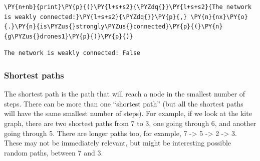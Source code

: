     \begin{tcolorbox}[breakable, size=fbox, boxrule=1pt, pad at break*=1mm,colback=cellbackground, colframe=cellborder]
\begin{Verbatim}[commandchars=\\\{\}]
\PY{n+nb}{print}\PY{p}{(}\PY{l+s+s2}{\PYZdq{}}\PY{l+s+s2}{The network is weakly connected:}\PY{l+s+s2}{\PYZdq{}}\PY{p}{,} \PY{n}{nx}\PY{o}{.}\PY{n}{is\PYZus{}strongly\PYZus{}connected}\PY{p}{(}\PY{n}{g\PYZus{}drones1}\PY{p}{)}\PY{p}{)}
\end{Verbatim}
\end{tcolorbox}

    \begin{Verbatim}[commandchars=\\\{\}]
The network is weakly connected: False
    \end{Verbatim}

    \hypertarget{shortest-paths}{%
\subsubsection{Shortest paths}\label{shortest-paths}}

The shortest path is the path that will reach a node in the smallest
number of steps. There can be more than one ``shortest path'' (but all
the shortest paths will have the same smallest number of steps). For
example, if we look at the kite graph, there are two shortest paths from
7 to 3, one going through 6, and another going through 5. There are
longer paths too, for example, 7 -\textgreater{} 5 -\textgreater{} 2
-\textgreater{} 3. These may not be immediately relevant, but might be
interesting possible random paths, between 7 and 3.

